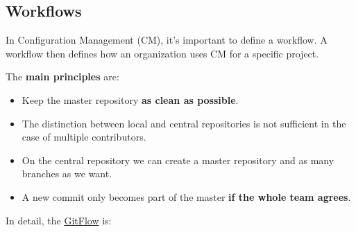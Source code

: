 \subsection{Workflows}

In Configuration Management (CM), it's important to define a workflow. A workflow then defines how an organization uses CM for a specific project.

\highspace
The \textbf{main principles} are:
\begin{itemize}
    \item Keep the master repository \textbf{as clean as possible}.

    \item The distinction between local and central repositories is not sufficient in the case of multiple contributors.
    
    \item On the central repository we can create a master repository and as many branches as we want.
    
    \item A new commit only becomes part of the master \textbf{if the whole team agrees}.
\end{itemize}
In detail, the \href{https://docs.github.com/en/get-started/using-github/github-flow}{GitFlow} is:
